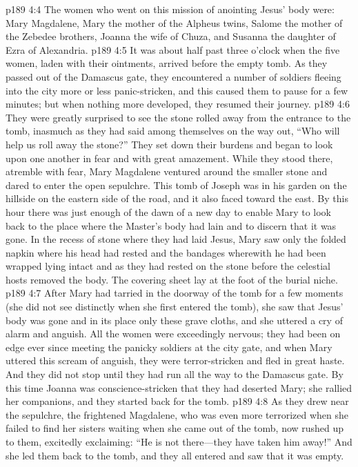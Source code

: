 \vs p189 4:4 The women who went on this mission of anointing Jesus’ body were: Mary Magdalene, Mary the mother of the Alpheus twins, Salome the mother of the Zebedee brothers, Joanna the wife of Chuza, and Susanna the daughter of Ezra of Alexandria.
\vs p189 4:5 It was about half past three o’clock when the five women, laden with their ointments, arrived before the empty tomb. As they passed out of the Damascus gate, they encountered a number of soldiers fleeing into the city more or less panic\hyp{}stricken, and this caused them to pause for a few minutes; but when nothing more developed, they resumed their journey.
\vs p189 4:6 They were greatly surprised to see the stone rolled away from the entrance to the tomb, inasmuch as they had said among themselves on the way out, “Who will help us roll away the stone?” They set down their burdens and began to look upon one another in fear and with great amazement. While they stood there, atremble with fear, Mary Magdalene ventured around the smaller stone and dared to enter the open sepulchre. This tomb of Joseph was in his garden on the hillside on the eastern side of the road, and it also faced toward the east. By this hour there was just enough of the dawn of a new day to enable Mary to look back to the place where the Master’s body had lain and to discern that it was gone. In the recess of stone where they had laid Jesus, Mary saw only the folded napkin where his head had rested and the bandages wherewith he had been wrapped lying intact and as they had rested on the stone before the celestial hosts removed the body. The covering sheet lay at the foot of the burial niche.
\vs p189 4:7 After Mary had tarried in the doorway of the tomb for a few moments (she did not see distinctly when she first entered the tomb), she saw that Jesus’ body was gone and in its place only these grave cloths, and she uttered a cry of alarm and anguish. All the women were exceedingly nervous; they had been on edge ever since meeting the panicky soldiers at the city gate, and when Mary uttered this scream of anguish, they were terror\hyp{}stricken and fled in great haste. And they did not stop until they had run all the way to the Damascus gate. By this time Joanna was conscience\hyp{}stricken that they had deserted Mary; she rallied her companions, and they started back for the tomb.
\vs p189 4:8 As they drew near the sepulchre, the frightened Magdalene, who was even more terrorized when she failed to find her sisters waiting when she came out of the tomb, now rushed up to them, excitedly exclaiming: “He is not there---they have taken him away!” And she led them back to the tomb, and they all entered and saw that it was empty.
